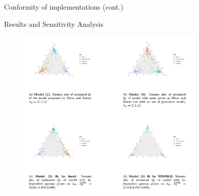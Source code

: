 \documentclass{beamer}
\begin{document}
\begin{frame}{Conformity of implementations (cont.)}
\begin{table}[]
\centering
\caption{\tiny{Estimates of the expected value of the elements of $Q_i$ a priori. Though the estimates of the two implementations are not equivalent up to Monte Carlo error, there are certainly strong similarities in reported values. Apparent differences have a likely source in the different estimated values of the concentration parameters reported in Table \ref{tab:concentration}. Note that the estimates in this table provide a good example of the ordering issue discussed previously.}}
\label{tab:expectations}
\end{table}
\end{frame}

\begin{frame}{Results and Sensitivity Analysis}
\begin{figure}
    \centering
    \includegraphics[width=0.8\textwidth]{SemesterProject/results_for_presentation.png}
    \label{fig:my_label}
\end{figure}
\end{frame}
\end{document}
